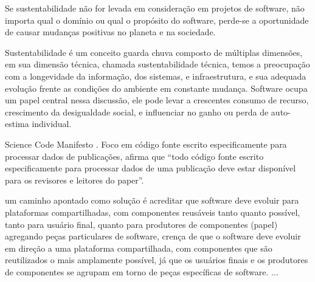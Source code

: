 Se sustentabilidade não for levada em consideração em projetos de software, não
importa qual o domínio ou qual o propósito do software, perde-se a oportunidade
de causar mudanças positivas no planeta e na sociedade.

%

Sustentabilidade é um conceito guarda chuva composto de múltiplas dimensões, em
sua dimensão técnica, chamada sustentabilidade técnica, temos a preocupação com
a longevidade da informação, dos sistemas, e infraestrutura, e sua adequada
evolução frente as condições do ambiente em constante mudança. Software ocupa
um papel central nessa discussão, ele pode levar a crescentes consumo de
recurso, crescimento da desigualdade social, e influenciar no ganho ou perda de
auto-estima individual.


Science Code Manifesto \cite{barnes2013science}.
Foco em código fonte escrito especificamente para processar dados de
publicações, afirma que ``todo código fonte escrito especificamente para
processar dados de uma publicação deve estar disponível para os revisores e
leitores do paper''.

um caminho apontado como solução é acreditar que software deve evoluir para plataformas compartilhadas,
com componentes reusáveis tanto quanto possível, tanto para usuário final, quanto
para produtores de componentes (papel) agregando peças particulares de software,
crença de que o software deve evoluir em direção a uma plataforma
compartilhada, com componentes que são reutilizados o mais amplamente possível,
já que os usuários finais e os produtores de componentes se agrupam em torno de
peças específicas de software.
...

